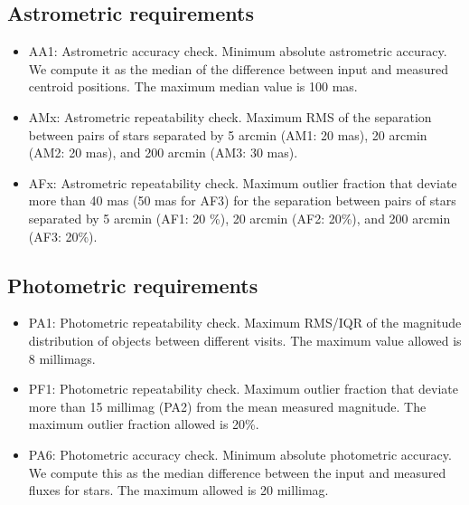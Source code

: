 \documentclass[a4paper,fleqn,usenatbib]{mnras}
\begin{document}

\subsection{Astrometric requirements}
\begin{itemize}
\item AA1: Astrometric accuracy check. Minimum absolute astrometric accuracy. We compute it as the median of the difference between input and measured centroid positions. The maximum median value is 100 mas.
\item AMx: Astrometric repeatability check. Maximum RMS of the separation between pairs of stars separated by 5 arcmin (AM1: 20 mas), 20 arcmin (AM2: 20 mas), and 200 arcmin (AM3: 30 mas). 
\item AFx: Astrometric repeatability check. Maximum outlier fraction that deviate more than 40 mas (50 mas for AF3) for the separation between pairs of stars separated by 5 arcmin (AF1: 20 \%), 20 arcmin (AF2: 20\%), and 200 arcmin (AF3: 20\%).
\end{itemize} 

\subsection{Photometric requirements}
\begin{itemize}
\item PA1: Photometric repeatability check. Maximum RMS/IQR of the magnitude distribution of objects between different visits. The maximum value allowed is 8 millimags.
\item PF1: Photometric repeatability check. Maximum outlier fraction that deviate more than 15 millimag (PA2) from the mean measured magnitude. The maximum outlier fraction allowed is 20\%. 
\item PA6: Photometric accuracy check. Minimum absolute photometric accuracy. We compute this as the median difference between the input and measured fluxes for stars. The maximum allowed is 20 millimag.
\end{itemize}
\end{document}
